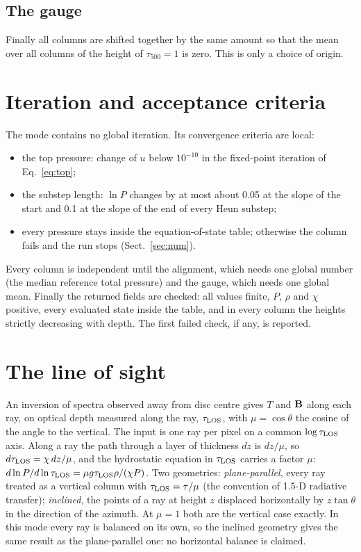 \subsection{The gauge}
Finally all columns are shifted together by the same amount so that the mean over all columns of the height of
$\tau_{500}=1$ is zero. This is only a choice of origin.

\section{Iteration and acceptance criteria}
The mode contains no global iteration. Its convergence criteria are local:
\begin{itemize}
\item the top pressure: change of $u$ below $10^{-10}$ in the fixed-point iteration of Eq.~\eqref{eq:top};
\item the substep length: $\ln P$ changes by at most about 0.05 at the slope of the start and 0.1 at the slope of the end of
every Heun substep;
\item every pressure stays inside the equation-of-state table; otherwise the column fails and the run stops
(Sect.~\ref{sec:num}).
\end{itemize}
Every column is independent until the alignment, which needs one global number (the median reference total pressure)
and the gauge, which needs one global mean. Finally the returned fields are checked: all values finite, $P$, $\rho$ and
$\chi$ positive, every evaluated state inside the table, and in every column the heights strictly decreasing with depth.
The first failed check, if any, is reported.

\section{The line of sight}\label{sec:view}
An inversion of spectra observed away from disc centre gives $T$ and $\mathbf B$ along each ray, on optical depth measured along the ray,
$\tau_{\rm LOS}$, with $\mu=\cos\theta$ the cosine of the angle to the vertical. The input is one ray per pixel on a common
$\log\tau_{\rm LOS}$ axis. Along a ray the path through a layer of thickness $dz$ is $dz/\mu$, so $d\tau_{\rm LOS}=\chi\,dz/\mu$, and
the hydrostatic equation in $\tau_{\rm LOS}$ carries a factor $\mu$: $d\ln P/d\ln\tau_{\rm LOS}=\mu g\tau_{\rm LOS}\rho/(\chi P)$.
Two geometries: \emph{plane-parallel}, every ray treated as a vertical column with $\tau_{\rm LOS}=\tau/\mu$ (the convention of
1.5-D radiative transfer); \emph{inclined}, the points of a ray at height $z$ displaced horizontally by $z\tan\theta$ in the
direction of the azimuth. At $\mu=1$ both are the vertical case exactly.
In this mode every ray is balanced on its own, so the inclined geometry gives the same result as the plane-parallel one: no
horizontal balance is claimed.

